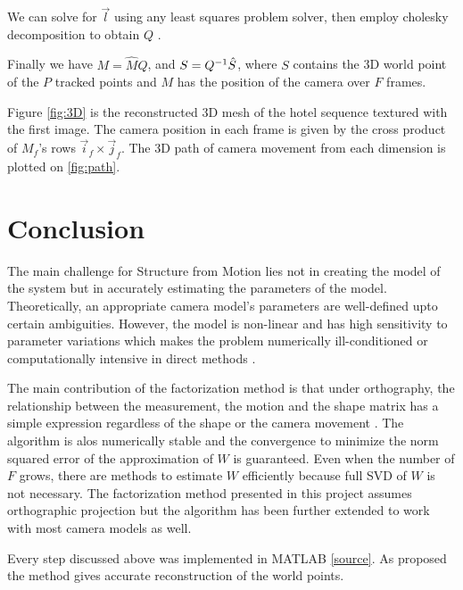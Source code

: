 We can solve for $\vec l$ using any least squares problem solver, then
employ cholesky decomposition to obtain $Q$ \cite{Morita}.

Finally we have $M = \hat MQ$, and $S =Q^{-1} \hat S$, where $S$
contains the 3D world point of the $P$ tracked points and $M$ has the
position of the camera over $F$ frames. 

Figure \ref{fig:3D} is the reconstructed 3D mesh of the hotel
sequence textured with the first image.
The camera position in each frame is given by the cross product of
$M_f$'s rows $\vec i_f \times \vec j_f$. The 3D path of camera
movement from each dimension is plotted on \ref{fig:path}.



\section{Conclusion}
\label{sec:conclusion}


The main challenge for Structure from Motion lies not in creating the
model of the system but in accurately estimating the parameters of the
model. Theoretically, an appropriate camera model's parameters are well-defined upto certain
ambiguities. However, the model is non-linear and has high sensitivity
to parameter variations which makes the problem numerically
ill-conditioned or computationally intensive in direct methods \cite{Morris}.

The main contribution of the factorization method is that under
orthography, the relationship between the measurement, the motion and
the shape matrix has a simple expression regardless of the shape or
the camera movement \cite{Tomasi}. The algorithm is alos numerically stable and the convergence to minimize the
norm squared error of the approximation of $W$ is guaranteed. Even
when the number of $F$ grows, there are methods to estimate $W$
efficiently because full SVD of $W$ is not necessary. 
The factorization method presented in this project assumes orthographic
projection but the algorithm has been further extended to work with
most camera models as well\cite{Morris}. 

Every step discussed above was implemented in MATLAB \ref{source}. As
proposed the method gives accurate reconstruction of the world
points. 

\label{source}





